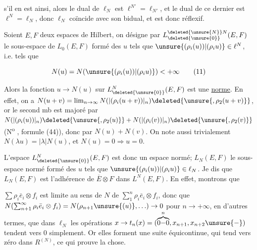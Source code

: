 \margin{\textcolor{red}{?}}

 s'il en est ainsi, alors le dual de $\ell_N$ est $\ell^{N'}=\ell_{N'}$, et le dual de ce dernier est $\ell^N=\ell_N$, donc $\ell_N$ coïncide avec son bidual, et est donc réflexif.

 Soient $E,F$ deux espaces de Hilbert,  on désigne par $L^{\deleted{\unsure{N}}N}_{\deleted{\unsure{0}}}(E,F)$ le  sous-espace de $L_0(E,F)$ formé des $u$ tels que $\unsure{(\rho_i(u))|(\rho_i u)}\in\ell^N$, i.e. tels que

\[
N(u)=N(\unsure{(\rho_i(u))|(\rho_i u)})<+\infty\tag*{(11)}
\]




 

Alors la fonction $u\to N(u)$ sur $L^N_{\deleted{\unsure{0}}}(E,F)$ est une \uline{norme}. En effet, on a $N(u+v)=\lim_{n\to\infty}N(|(\rho_i(u+v))|_n)\deleted{\unsure{,\rho_2(u+v)}}$, or le second mb est majoré par $N(|(\rho_i(u))|_n)\deleted{\unsure{,\rho_2(u)}}+N(|(\rho_i(v))|_n)\deleted{\unsure{,\rho_2(v)}}$ (N\textsuperscript{o} , formule (44)), donc par $N(u)+N(v)$. On note aussi trivialement $N(\lambda u)=|\lambda|N(u)$, et $N(u)=0\Rightarrow u=0$.


L'espace $L^N_{\deleted{\unsure{0}}}(E,F)$ est donc un espace normé;  $L_N(E,F)$ le sous-espace normé formé des $u$ tels que $\unsure{(\rho_i(u))|(\rho_i u)}\in\ell_N$. Je dis que $L_N(E,F)$ est l'adhérence de $\overline E\otimes F$ dans $L^N(E,F)$. En effet, montrons que

$\sum\rho_i\bar e_i\otimes f_i$ est limite au sens de $N$ de $\sum_1^n\rho_i\bar e_i\otimes f_i$, donc que $N(\sum_{n+1}^\infty\rho_i\bar e_i\otimes f_i)=N(\rho_{n+1}\unsure{(u)},\ldots)\to 0$ pour $n\to+\infty$, en d'autres termes, que dans $\ell_N$ les opérations $x\to t_n(x)=(\overbrace{0{-}0}^{n},x_{n+1},x_{n+2}\unsure{-})$ tendent vers $0$ simplement. Or elles forment une suite équicontinue, qui tend vers zéro dans  $R^{(N)}$, ce qui prouve la chose. 

